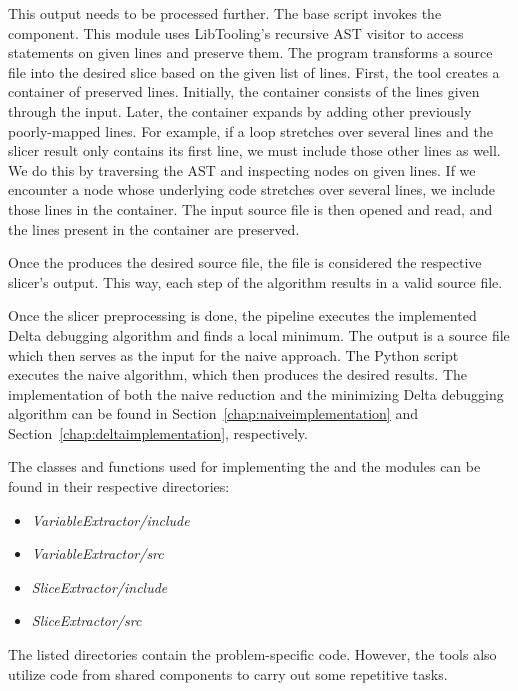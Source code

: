 This output needs to be processed further. 
The base script invokes the  component. 
This module uses LibTooling's recursive AST visitor to access statements on 
given lines and preserve them. 
The program transforms a source file into the desired slice based on 
the given list of lines. 
First, the tool creates a container of preserved lines. 
Initially, the container consists of the lines given through the input. 
Later, the container expands by adding other previously poorly-mapped lines. 
For example, if a  loop stretches over several lines and 
the slicer result only contains its first line, we must include those other 
lines as well. 
We do this by traversing the AST and inspecting nodes on given lines. 
If we encounter a node whose underlying code stretches over several lines, 
we include those lines in the container. 
The input source file is then opened and read, and the lines present in 
the container are preserved. 

Once the  produces the desired source file, the file 
is considered the respective slicer's output.
This way, each step of the algorithm results in a valid source file.

Once the slicer preprocessing is done, the pipeline executes the implemented 
Delta debugging algorithm and finds a local minimum. 
The output is a source file which then serves as the input for the naive 
approach.
The Python script executes the naive algorithm, which then produces the 
desired results.
The implementation of both the naive reduction and the minimizing Delta 
debugging algorithm can be found in Section~\ref{chap:naiveimplementation} 
and Section~\ref{chap:deltaimplementation}, respectively.

The classes and functions used for implementing 
the  and the  modules can be 
found in their respective directories:
\begin{itemize}
  \item \emph{VariableExtractor/include}
  \item \emph{VariableExtractor/src}
  \item \emph{SliceExtractor/include}
  \item \emph{SliceExtractor/src}
\end{itemize}
The listed directories contain the problem-specific code. 
However, the tools also utilize code from shared components to carry out 
some repetitive tasks.